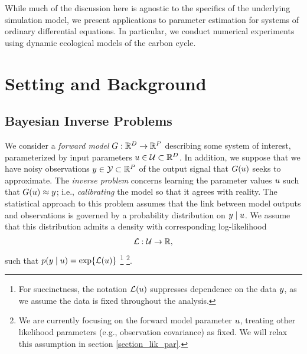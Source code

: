 \documentclass[12pt]{article}
\begin{document}
While much of the discussion here is agnostic to the specifics of the underlying simulation model, we present applications 
to parameter estimation for systems of ordinary differential equations. In particular, we conduct numerical experiments 
using dynamic ecological models of the carbon cycle.

\section{Setting and Background}

\subsection{Bayesian Inverse Problems}
We consider a \textit{forward model} $G: \mathbb{R}^{D} \to \mathbb{R}^{P}$ describing some system of interest, parameterized by 
input parameters $u \in \mathcal{U} \subset \mathbb{R}^{D}$. In addition, we suppose that we have noisy observations 
$y \in \mathcal{Y} \subset \mathbb{R}^{P}$ of the output signal that $G(u)$ seeks to approximate. The 
\textit{inverse problem} concerns learning the parameter values $u$ such that $G(u) \approx y$; i.e., \textit{calibrating}
the model so that it agrees with reality. The statistical approach to this problem assumes that the link between model outputs and 
observations is governed by a probability distribution on  $y \mid u$. We assume that this distribution admits a density 
with corresponding log-likelihood 
\begin{align}
\mathcal{L}: \mathcal{U} \to \mathbb{R}, \label{log_likelihood}
\end{align}
such that $p(y \mid u) = \exp\mathopen{}\left\{\mathcal{L}(u)\right\}\mathclose{}$ 
\footnote{For succinctness, the notation $\mathcal{L}(u)$ suppresses dependence on the data $y$, 
as we assume the data is fixed throughout the analysis.}
\footnote{We are currently focusing on the forward model parameter $u$, treating other likelihood 
parameters (e.g., observation covariance) as fixed. We will relax this assumption 
in section \ref{section_lik_par}.}.
\end{document}
